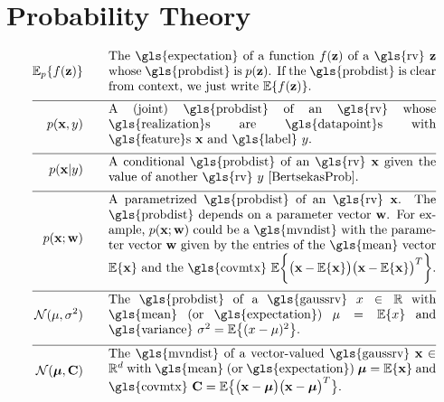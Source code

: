 \section*{Probability Theory} 
\begin{align}
	\expect_{p} \{ f(\datapoint) \}  \quad\quad & \parbox{.75\textwidth}{The \gls{expectation} of a function $f(\datapoint)$ of a \gls{rv} 
		$\datapoint$ whose \gls{probdist} is $\prob{\datapoint}$. If the \gls{probdist} is clear from context, 
		we just write $\expect \{ f(\datapoint) \}$. }  \nonumber \\[2mm] \hline \nonumber\\[-5mm]    
	\prob{\featurevec,\truelabel} \quad\quad & \parbox{.75\textwidth}{A (joint) \gls{probdist} of an \gls{rv} 
		whose \gls{realization}s are \gls{datapoint}s with \gls{feature}s $\featurevec$ and \gls{label} $\truelabel$.} \nonumber        \nonumber \\[2mm] \hline \nonumber\\[-5mm]        
	\prob{\featurevec|\truelabel} \quad\quad & \parbox{.75\textwidth}{A conditional \gls{probdist} of an \gls{rv} 
		$\featurevec$ given the value of another \gls{rv} $\truelabel$ \cite[Sec.\ 3.5]{BertsekasProb}. } \nonumber       \nonumber \\[2mm] \hline \nonumber\\[-5mm]           
	\prob{\featurevec;\weights} \quad\quad & \parbox{.75\textwidth}{A parametrized \gls{probdist} of an \gls{rv} $\featurevec$. 
		The \gls{probdist} depends on a parameter vector $\weights$. For example, $\prob{\featurevec;\weights}$ could be a 
		\gls{mvndist} with the parameter vector $\weights$ given by the entries of the \gls{mean} vector $\expect \{ \featurevec \}$ 
		and the \gls{covmtx} $\expect \bigg \{ \big( \featurevec - \expect \{ \featurevec \}\big) \big( \featurevec - \expect \{ \featurevec \}\big)^{T}  \bigg\}$.} \nonumber           \nonumber \\[2mm] \hline \nonumber\\[-5mm]
	\mathcal{N}(\mu, \sigma^{2}) \quad\quad & \parbox{.75\textwidth}{The \gls{probdist} of a 
		\gls{gaussrv} $\feature \in \mathbb{R}$ with \gls{mean} (or \gls{expectation}) $\mu= \expect \{ \feature \}$ 
		and \gls{variance} $\sigma^{2} =   \expect \big\{  (  \feature - \mu )^2 \big\}$.} \nonumber    \nonumber \\[2mm] \hline \nonumber\\[-5mm]
	\mathcal{N}(\clustermean, \mathbf{C}) \quad\quad & \parbox{.75\textwidth}{The \gls{mvndist} of a vector-valued 
		\gls{gaussrv} $\featurevec \in \mathbb{R}^{\featuredim}$ with \gls{mean} (or \gls{expectation}) $\clustermean= \expect \{ \featurevec \}$ 
		and \gls{covmtx} $\mathbf{C} =  \expect \big\{ \big( \featurevec - \clustermean \big)\big( \featurevec - \clustermean \big)^{T} \big\}$.} \nonumber                                             
\end{align}





